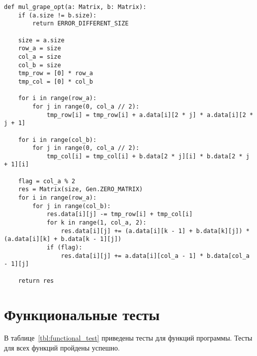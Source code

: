 \clearpage

\begin{center}
    \captionsetup{justification=raggedright,singlelinecheck=off}
    \begin{lstlisting}[label=lst:opt_grape,caption=Оптимизированный алгоритм Винограда]
def mul_grape_opt(a: Matrix, b: Matrix):
	if (a.size != b.size):
		return ERROR_DIFFERENT_SIZE
	
	size = a.size
	row_a = size
	col_a = size
	col_b = size
	tmp_row = [0] * row_a
	tmp_col = [0] * col_b
	
	for i in range(row_a):
		for j in range(0, col_a // 2):
			tmp_row[i] = tmp_row[i] + a.data[i][2 * j] * a.data[i][2 * j + 1]

	for i in range(col_b):
		for j in range(0, col_a // 2):
			tmp_col[i] = tmp_col[i] + b.data[2 * j][i] * b.data[2 * j + 1][i] 

	flag = col_a % 2
	res = Matrix(size, Gen.ZERO_MATRIX)
	for i in range(row_a):
		for j in range(col_b):
			res.data[i][j] -= tmp_row[i] + tmp_col[i]
			for k in range(1, col_a, 2):
				res.data[i][j] += (a.data[i][k - 1] + b.data[k][j]) * (a.data[i][k] + b.data[k - 1][j])
			if (flag):
				res.data[i][j] += a.data[i][col_a - 1] * b.data[col_a - 1][j]

	return res
\end{lstlisting}
\end{center}

\clearpage

\section{Функциональные тесты}

В таблице~\ref{tbl:functional_test} приведены тесты для функций программы. Тесты для всех функций пройдены успешно.

